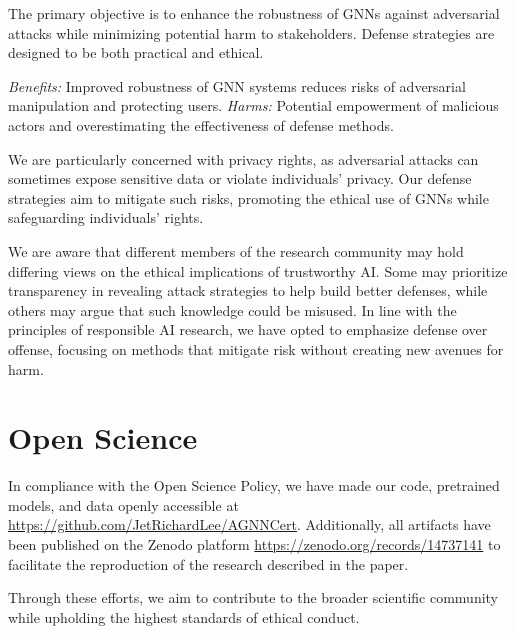 \vspace{+0.1in}
\vspace{+0.05in}

 The primary objective is to enhance the robustness of GNNs against adversarial attacks while minimizing potential harm to stakeholders. Defense strategies are designed to be both practical and ethical.

 \emph{Benefits:} Improved robustness 
of GNN systems reduces risks of adversarial manipulation and protecting users. \emph{Harms:} Potential empowerment of malicious actors and overestimating the effectiveness of defense methods.

 We are particularly concerned with privacy rights, as adversarial attacks can sometimes expose sensitive data or violate individuals' privacy. Our defense strategies aim to mitigate such risks, promoting the ethical use of GNNs while safeguarding individuals’ rights.



\vspace{+0.1in}
\vspace{+0.05in}

\noindent We are aware that different members of the research community may hold differing views on the ethical implications of trustworthy AI. Some may prioritize transparency in revealing attack strategies to help build better defenses, while others may argue that such knowledge could be misused. In line with the principles of responsible AI research, we have opted to emphasize defense over offense, focusing on methods that mitigate risk without creating new avenues for harm.



\section{Open Science}


In compliance with the Open Science Policy, we have made our code, pretrained models, and data openly accessible at \url{https://github.com/JetRichardLee/AGNNCert}. Additionally, all artifacts have been published on the Zenodo platform \url{https://zenodo.org/records/14737141} to facilitate the reproduction of the research described in the paper. 

Through these efforts, we aim to contribute to the broader scientific community while upholding the highest standards of ethical conduct.


